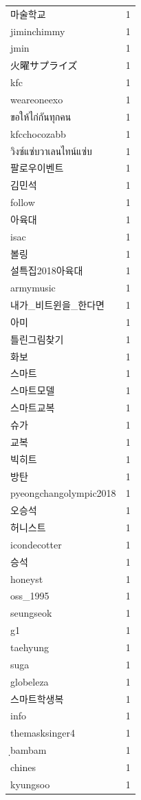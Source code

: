 \begin{tabular}{lr}
마술학교 & 1 \\
jiminchimmy & 1 \\
jmin & 1 \\
火曜サプライズ & 1 \\
kfc & 1 \\
weareoneexo & 1 \\
ขอให้ไก่กันทุกคน & 1 \\
kfcchocozabb & 1 \\
วิงซ์แซ่บวาเลนไทน์แซ่บ & 1 \\
팔로우이벤트 & 1 \\
김민석 & 1 \\
follow & 1 \\
아육대 & 1 \\
isac & 1 \\
볼링 & 1 \\
설특집2018아육대 & 1 \\
armymusic & 1 \\
내가\_비트윈을\_한다면 & 1 \\
아미 & 1 \\
틀린그림찾기 & 1 \\
화보 & 1 \\
스마트 & 1 \\
스마트모델 & 1 \\
스마트교복 & 1 \\
슈가 & 1 \\
교복 & 1 \\
빅히트 & 1 \\
방탄 & 1 \\
pyeongchangolympic2018 & 1 \\
오승석 & 1 \\
허니스트 & 1 \\
icondecotter & 1 \\
승석 & 1 \\
honeyst & 1 \\
oss\_1995 & 1 \\
seungseok & 1 \\
g1 & 1 \\
taehyung & 1 \\
suga & 1 \\
globeleza & 1 \\
스마트학생복 & 1 \\
info & 1 \\
themasksinger4 & 1 \\
ฺbambam & 1 \\
chines & 1 \\
kyungsoo & 1 \\

\end{tabular}

